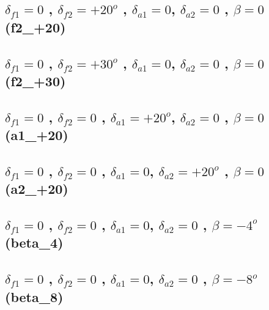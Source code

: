 \documentclass[titlepage,10pt]{article}
\begin{document}
\subsection{$\delta_{f1} = 0$ , $\delta_{f2} = +20^o$ , $\delta_{a1} = 0$, $\delta_{a2} = 0$ , $\beta=0$ (f2\_+20)}
\begin{tiny}\end{tiny}

\subsection{$\delta_{f1} = 0$ , $\delta_{f2} = +30^o$ , $\delta_{a1} = 0$, $\delta_{a2} = 0$ , $\beta=0$ (f2_+30)}
\begin{tiny}\end{tiny}

\subsection{$\delta_{f1} = 0$ , $\delta_{f2} = 0$ , $\delta_{a1} = +20^o$, $\delta_{a2} = 0$ , $\beta=0$ (a1\_+20)}
\begin{tiny}\end{tiny}

\subsection{$\delta_{f1} = 0$ , $\delta_{f2} = 0$ , $\delta_{a1} = 0$, $\delta_{a2} = +20^o$ , $\beta=0$ (a2\_+20)}
\begin{tiny}\end{tiny}

\subsection{$\delta_{f1} = 0$ , $\delta_{f2} = 0$ , $\delta_{a1} = 0$, $\delta_{a2} = 0$ , $\beta=-4^o$  (beta\_4)}
\begin{tiny}\end{tiny}

\subsection{$\delta_{f1} = 0$ , $\delta_{f2} = 0$ , $\delta_{a1} = 0$, $\delta_{a2} = 0$ , $\beta=-8^o$  (beta\_8)}
\begin{tiny}\end{tiny}
\end{document}
